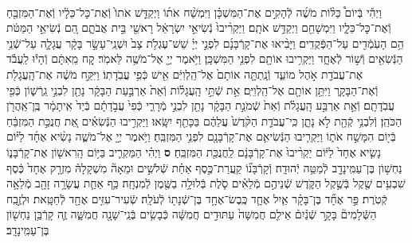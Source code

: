 \documentclass[twoside, openany, parskip=half, 11pt]{book}
\begin{document}
\begin{footnotesize}
\begin{multicols}{2}
\\
וַיְהִ֡י בְּֿיוֹם֩ כַּלּ֨וֹת מֹשֶׁ֜ה לְֿהָקִ֣ים אֶת־הַמִּשְׁכָּ֗ן וַיִּמְשַׁ֨ח אֹת֜וֹ וַיְקַדֵּ֤שׁ אֹתוֹ֙ וְֿאֶת־כׇּל־כֵּלָ֔יו וְֿאֶת־הַמִּזְבֵּ֖חַ וְֿאֶת־כׇּל־כֵּלָ֑יו וַיִּמְשָׁחֵ֖ם וַיְקַדֵּ֥שׁ אֹתָֽם׃ וַיַּקְרִ֨יבוּ֙ נְֿשִׂיאֵ֣י יִשְׂרָאֵ֔ל רָאשֵׁ֖י בֵּ֣ית אֲבֹתָ֑ם הֵ֚ם נְֿשִׂיאֵ֣י הַמַּטֹּ֔ת הֵ֥ם הָעֹֽמְֿדִ֖ים עַל־הַפְּֿקֻדִֽים׃ וַיָּבִ֨יאוּ אֶת־קָרְֿבָּנָ֜ם לִפְנֵ֣י יְיָ֗ שֵׁשׁ־עֶגְלֹ֥ת צָב֙ וּשְׁנֵֽי־עָשָׂ֣ר בָּקָ֔ר עֲגָלָ֛ה עַל־שְֿׁנֵ֥י הַנְּֿשִׂאִ֖ים וְֿשׁ֣וֹר לְֿאֶחָ֑ד וַיַּקְרִ֥יבוּ אוֹתָ֖ם לִפְנֵ֥י הַמִּשְׁכָּֽן׃ 
וַיֹּ֥אמֶר יְיָ֖ אֶל־מֹשֶׁ֥ה לֵּאמֹֽר׃ קַ֚ח מֵֽאִתָּ֔ם וְֿהָי֕וּ לַֽעֲבֹ֕ד אֶת־עֲבֹדַ֖ת אֹ֣הֶל מוֹעֵ֑ד וְֿנָֽתַתָּ֤ה אוֹתָם֙ אֶל־הַֽלְוִיִּ֔ם אִ֖ישׁ כְּֿפִ֥י עֲבֹֽדָתֽוֹ׃ וַיִּקַּ֣ח מֹשֶׁ֔ה אֶת־הָֽעֲגָלֹ֖ת וְֿאֶת־הַבָּקָ֑ר וַיִּתֵּ֥ן אוֹתָ֖ם אֶל־הַֽלְוִיִּֽם׃ אֵ֣ת שְֿׁתֵּ֣י הָֽעֲגָל֗וֹת וְֿאֵת֙ אַרְבַּ֣עַת הַבָּקָ֔ר נָתַ֖ן לִבְנֵ֣י גֵֽרְֿשׁ֑וֹן כְּֿפִ֖י עֲבֹֽדָתָֽם׃ וְֿאֵ֣ת אַרְבַּ֣ע הָֽעֲגָלֹ֗ת וְֿאֵת֙ שְֿׁמֹנַ֣ת הַבָּקָ֔ר נָתַ֖ן לִבְנֵ֣י מְֿרָרִ֑י כְּֿפִי֙ עֲבֹ֣דָתָ֔ם בְּֿיַד֙ אִֽיתָמָ֔ר בֶּֽן־אַֽהֲרֹ֖ן הַכֹּהֵֽן׃ וְֿלִבְנֵ֥י קְֿהָ֖ת לֹ֣א נָתָ֑ן כִּֽי־עֲבֹדַ֤ת הַקֹּ֨דֶשׁ֙ עֲלֵהֶ֔ם בַּכָּתֵ֖ף יִשָּֽׂאוּ׃ וַיַּקְרִ֣יבוּ הַנְּֿשִׂאִ֗ים אֵ֚ת חֲנֻכַּ֣ת הַמִּזְבֵּ֔חַ בְּֿי֖וֹם הִמָּשַׁ֣ח אֹת֑וֹ וַיַּקְרִ֧יבוּ הַנְּֿשִׂיאִ֛ם אֶת־קָרְֿבָּנָ֖ם לִפְנֵ֥י הַמִּזְבֵּֽחַ׃ וַיֹּ֥אמֶר יְיָ֖ אֶל־מֹשֶׁ֑ה נָשִׂ֨יא אֶחָ֜ד לַיּ֗וֹם נָשִׂ֤יא אֶחָד֙ לַיּ֔וֹם יַקְרִ֨יבוּ֙ אֶת־קָרְֿבָּנָ֔ם לַֽחֲנֻכַּ֖ת הַמִּזְבֵּֽחַ׃ \textbf{ס}  
וַיְהִ֗י הַמַּקְרִ֛יב בַּיּ֥וֹם הָֽרִאשׁ֖וֹן אֶת־קָרְֿבָּנ֑וֹ נַחְשׁ֥וֹן בֶּן־עַמִּֽינָדָ֖ב לְֿמַטֵּ֥ה יְֿהוּדָֽה׃ וְֿקָרְֿבָּנ֞וֹ קַֽעֲרַת־כֶּ֣סֶף אַחַ֗ת שְֿׁלֹשִׁ֣ים וּמֵאָה֘ מִשְׁקָלָהּ֒ מִזְרָ֤ק אֶחָד֙ כֶּ֔סֶף שִׁבְעִ֥ים שֶׁ֖קֶל בְּֿשֶׁ֣קֶל הַקֹּ֑דֶשׁ שְֿׁנֵיהֶ֣ם מְֿלֵאִ֗ים סֹ֛לֶת בְּֿלוּלָ֥ה בַשֶּׁ֖מֶן לְֿמִנְחָֽה׃ כַּ֥ף אַחַ֛ת עֲשָׂרָ֥ה זָהָ֖ב מְֿלֵאָ֥ה קְֿטֹֽרֶת׃
פַּ֣ר אֶחָ֞ד בֶּן־בָּקָ֗ר אַ֧יִל אֶחָ֛ד כֶּֽבֶשׂ־אֶחָ֥ד בֶּן־שְֿׁנָת֖וֹ לְֿעֹלָֽה׃ שְֿׂעִיר־עִזִּ֥ים אֶחָ֖ד לְֿחַטָּֽאת׃ וּלְזֶ֣בַֽח הַשְּֿׁלָמִים֘ בָּקָ֣ר שְֿׁנַ֒יִם֒ אֵילִ֤ם חֲמִשָּׁה֙ עַתּוּדִ֣ים חֲמִשָּׁ֔ה כְּֿבָשִׂ֥ים בְּֿנֵֽי־שָׁנָ֖ה חֲמִשָּׁ֑ה זֶ֛ה קָרְֿבַּ֥ן נַחְשׁ֖וֹן בֶּן־עַמִּֽינָדָֽב׃



\end{multicols}
\end{footnotesize}
\end{document}

